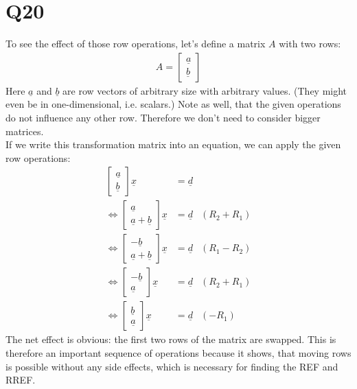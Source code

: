 \documentclass{article}
\renewcommand{\vec}{\underline}
\begin{document}
\section*{Q20}
To see the effect of those row operations, let's define a matrix $A$ with two rows:
\begin{align}
    A = \begin{bmatrix}
        \vec a\\
        \vec b
    \end{bmatrix}
\end{align}
Here $\vec a$ and $\vec b$ are row vectors of arbitrary size with arbitrary values. 
(They might even be in one-dimensional, i.e. scalars.) Note as well, that the given operations do not influence any other row. Therefore we don't need to consider bigger matrices.\\
If we write this transformation matrix into an equation, we can apply the given row operations:
\begin{align}
    \begin{bmatrix}
        \vec a\\
        \vec b
    \end{bmatrix} \vec x &= \vec d\\
    \Leftrightarrow\begin{bmatrix}
        \vec a\\
        \vec a + \vec b
    \end{bmatrix} \vec x &= \vec d
    & (R_2 + R_1)\\
    \Leftrightarrow\begin{bmatrix}
        -\vec b\\
        \vec a + \vec b
    \end{bmatrix} \vec x &= \vec d
    & (R_1 - R_2)\\
    \Leftrightarrow\begin{bmatrix}
        -\vec b\\
        \vec a
    \end{bmatrix} \vec x &= \vec d
    & (R_2 + R_1)\\
    \Leftrightarrow\begin{bmatrix}
        \vec b\\
        \vec a
    \end{bmatrix} \vec x &= \vec d
    & (-R_1)
\end{align}
The net effect is obvious: the first two rows of the matrix are swapped.
This is therefore an important sequence of operations because it shows, that moving rows is possible without any side effects, which is necessary for finding the REF and RREF.
\end{document}
